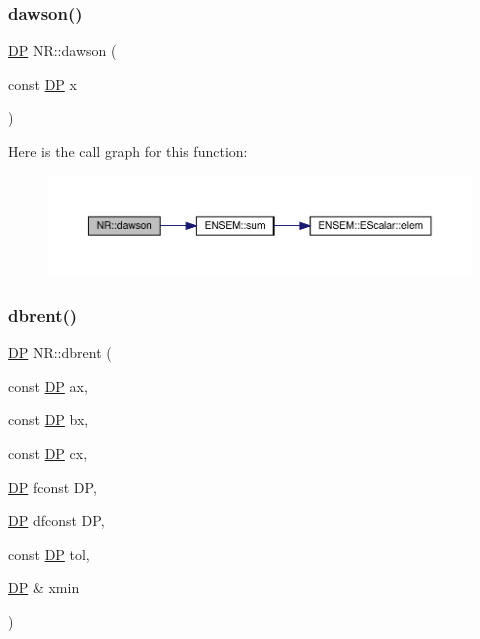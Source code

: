 \mbox{\label{namespaceNR_a6e1128d2427bfc7d48d0f09057399227}} 
\subsubsection{\texorpdfstring{dawson()}{dawson()}}
{\footnotesize\ttfamily \mbox{\hyperlink{namespaceNR_af6ff762dd605ff477b8e52387253a02a}{DP}} N\+R\+::dawson (\begin{DoxyParamCaption}\item[{const \mbox{\hyperlink{namespaceNR_af6ff762dd605ff477b8e52387253a02a}{DP}}}]{x }\end{DoxyParamCaption})}

Here is the call graph for this function\+:
\nopagebreak
\begin{figure}[H]
\begin{center}
\leavevmode
\includegraphics[width=350pt]{da/d46/namespaceNR_a6e1128d2427bfc7d48d0f09057399227_cgraph}
\end{center}
\end{figure}
\mbox{\label{namespaceNR_af1d68c637282cf655b5c683b052a0b6d}} 
\subsubsection{\texorpdfstring{dbrent()}{dbrent()}}
{\footnotesize\ttfamily \mbox{\hyperlink{namespaceNR_af6ff762dd605ff477b8e52387253a02a}{DP}} N\+R\+::dbrent (\begin{DoxyParamCaption}\item[{const \mbox{\hyperlink{namespaceNR_af6ff762dd605ff477b8e52387253a02a}{DP}}}]{ax,  }\item[{const \mbox{\hyperlink{namespaceNR_af6ff762dd605ff477b8e52387253a02a}{DP}}}]{bx,  }\item[{const \mbox{\hyperlink{namespaceNR_af6ff762dd605ff477b8e52387253a02a}{DP}}}]{cx,  }\item[{\mbox{\hyperlink{namespaceNR_af6ff762dd605ff477b8e52387253a02a}{DP}} }]{fconst DP,  }\item[{\mbox{\hyperlink{namespaceNR_af6ff762dd605ff477b8e52387253a02a}{DP}} }]{dfconst DP,  }\item[{const \mbox{\hyperlink{namespaceNR_af6ff762dd605ff477b8e52387253a02a}{DP}}}]{tol,  }\item[{\mbox{\hyperlink{namespaceNR_af6ff762dd605ff477b8e52387253a02a}{DP}} \&}]{xmin }\end{DoxyParamCaption})}

